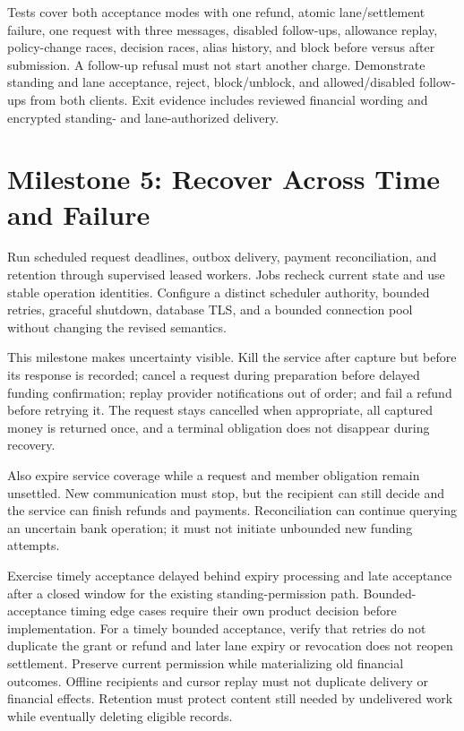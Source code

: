 \documentclass[11pt]{article}
\begin{document}
Tests cover both acceptance modes with one refund, atomic lane/settlement failure,
one request with three messages, disabled follow-ups,
allowance replay, policy-change races, decision races, alias history, and block
before versus after submission. A follow-up refusal must not start another charge.
Demonstrate standing and lane acceptance, reject, block/unblock, and allowed/disabled follow-ups from
both clients. Exit evidence includes reviewed financial wording and encrypted
standing- and lane-authorized delivery.

\section{Milestone 5: Recover Across Time and Failure}

Run scheduled request deadlines, outbox delivery, payment reconciliation, and
retention through supervised leased workers. Jobs recheck current state and use
stable operation identities. Configure a distinct scheduler authority, bounded
retries, graceful shutdown, database TLS, and a bounded connection pool without
changing the revised semantics.

This milestone makes uncertainty visible. Kill the service after capture but
before its response is recorded; cancel a request during preparation before delayed funding
confirmation; replay provider notifications out of order; and fail a refund before
retrying it. The request stays cancelled when appropriate, all captured money is
returned once, and a terminal obligation does not disappear during recovery.

Also expire service coverage while a request and member obligation remain
unsettled. New communication must stop, but the recipient can still decide and
the service can finish refunds and payments. Reconciliation can continue querying
an uncertain bank operation; it must not initiate unbounded new funding attempts.

Exercise timely acceptance delayed behind expiry processing and late acceptance
after a closed window for the existing standing-permission path. Bounded-acceptance
timing edge cases require their own product decision before implementation.
For a timely bounded acceptance, verify that retries do not duplicate the grant
or refund and later lane expiry or revocation does not reopen settlement.
Preserve current permission while materializing old
financial outcomes. Offline recipients and cursor replay must not duplicate
delivery or financial effects. Retention must protect content still needed by
undelivered work while eventually deleting eligible records.
\end{document}
